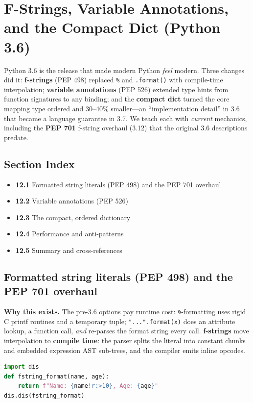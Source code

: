 \chapter{F-Strings, Variable Annotations, and the Compact Dict (Python 3.6)}

Python 3.6 is the release that made modern Python \emph{feel} modern. Three changes did it:
\textbf{f-strings} (PEP 498) replaced \texttt{\%} and \texttt{.format()} with compile-time
interpolation; \textbf{variable annotations} (PEP 526) extended type hints from function signatures
to any binding; and the \textbf{compact dict} turned the core mapping type ordered and 30--40\%
smaller---an ``implementation detail'' in 3.6 that became a language guarantee in 3.7. We teach each
with \emph{current} mechanics, including the \textbf{PEP 701} f-string overhaul (3.12) that the
original 3.6 descriptions predate.

\section*{Section Index}
\begin{itemize}
  \item \textbf{12.1} Formatted string literals (PEP 498) and the PEP 701 overhaul
  \item \textbf{12.2} Variable annotations (PEP 526)
  \item \textbf{12.3} The compact, ordered dictionary
  \item \textbf{12.4} Performance and anti-patterns
  \item \textbf{12.5} Summary and cross-references
\end{itemize}

\section{Formatted string literals (PEP 498) and the PEP 701 overhaul}

\textbf{Why this exists.} The pre-3.6 options pay runtime cost: \texttt{\%}-formatting uses rigid C
printf routines and a temporary tuple; \texttt{"...".format(x)} does an attribute lookup, a
function call, \emph{and} re-parses the format string every call. \textbf{f-strings} move
interpolation to \textbf{compile time}: the parser splits the literal into constant chunks and
embedded expression AST sub-trees, and the compiler emits inline opcodes.

\begin{lstlisting}[language=Python, caption={An f-string compiles to inline formatting opcodes --- no .format() call.}]
import dis
def fstring_format(name, age):
    return f"Name: {name!r:>10}, Age: {age}"
dis.dis(fstring_format)
\end{lstlisting}

